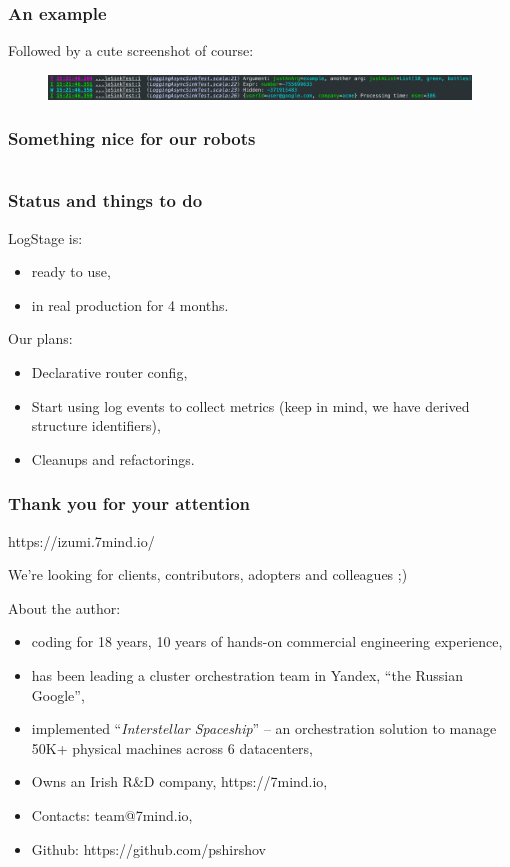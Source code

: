 \documentclass[usenames,dvipsnames]{beamer}
\begin{document}
\begin{frame}
\frametitle{An example}
Followed by a cute screenshot of course:
\begin{figure}
    \includegraphics[width=\textwidth]{media/logstage-console.png}
\end{figure}
\end{frame}

\begin{frame}
\frametitle{Something nice for our robots}
\begin{figure}
    \inputminted[fontsize=\scriptsize]{json}{ex-json-out.tmp}
\end{figure}
\end{frame}

\begin{frame}
\frametitle{Status and things to do}
LogStage is:
\begin{itemize}
\item ready to use,
\item in real production for 4 months.
\end{itemize}
\vspace{0.3cm}
Our plans:
\begin{itemize}
\item Declarative router config,
\item Start using log events to collect metrics (keep in mind, we have derived structure identifiers),
\item Cleanups and refactorings.
\end{itemize}
\end{frame}

\begin{frame}
    \frametitle{Thank you for your attention}

    \begin{center}
      https://izumi.7mind.io/

      We're looking for clients, contributors, adopters and colleagues ;)
    \end{center}

    About the author:
    \begin{itemize}
        \item coding for 18 years, 10 years of hands-on commercial engineering experience,
        \item has been leading a cluster orchestration team in Yandex, ``the Russian Google'',
        \item implemented ``\textit{Interstellar Spaceship}'' -- an orchestration solution to manage 50K+ physical machines across 6 datacenters,
        \item Owns an Irish R\&D company, https://7mind.io,
        \item Contacts: team@7mind.io,
        \item Github: https://github.com/pshirshov
    \end{itemize}
\end{frame}
\end{document}
